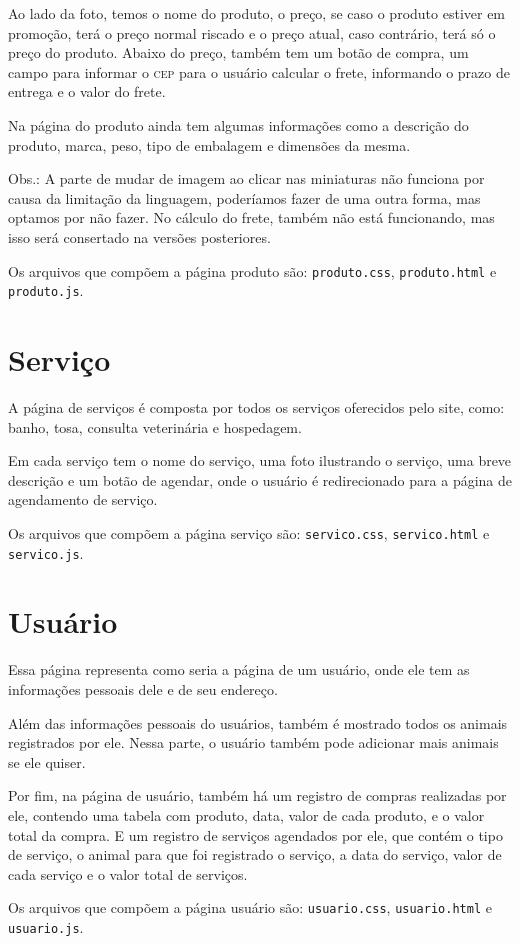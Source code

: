 Ao lado da foto, temos o nome do produto, o preço, se caso o produto estiver em promoção, terá
o preço normal riscado e o preço atual, caso contrário, terá só o preço do produto. Abaixo do
preço, também tem um botão de compra, um campo para informar o \textsc{cep} para o usuário
calcular o frete, informando o prazo de entrega e o valor do frete.

Na página do produto ainda tem algumas informações como a descrição do produto, marca, peso,
tipo de embalagem e dimensões da mesma.

Obs.: A parte de mudar de imagem ao clicar nas miniaturas não funciona por causa da limitação da
linguagem, poderíamos fazer de uma outra forma, mas optamos por não fazer. No cálculo do frete,
também não está funcionando, mas isso será consertado na versões posteriores.

Os arquivos que compõem a página produto são: \texttt{produto.css}, \texttt{produto.html} e
\texttt{produto.js}.

\section{Serviço}
A página de serviços é composta por todos os serviços oferecidos pelo site, como: banho, tosa,
consulta veterinária e hospedagem.

Em cada serviço tem o nome do serviço, uma foto ilustrando o serviço, uma breve descrição e um
botão de agendar, onde o usuário é redirecionado para a página de agendamento de serviço.

Os arquivos que compõem a página serviço são: \texttt{servico.css}, \texttt{servico.html} e
\texttt{servico.js}.

\section{Usuário}
Essa página representa como seria a página de um usuário, onde ele tem as informações pessoais
dele e de seu endereço.

Além das informações pessoais do usuários, também é mostrado todos os animais registrados por
ele. Nessa parte, o usuário também pode adicionar mais animais se ele quiser.

Por fim, na página de usuário, também há um registro de compras realizadas por ele, contendo
uma tabela com produto, data, valor de cada produto, e o valor total da compra. E um registro
de serviços agendados por ele, que contém o tipo de serviço, o animal para que foi registrado
o serviço, a data do serviço, valor de cada serviço e o valor total de serviços.

Os arquivos que compõem a página usuário são: \texttt{usuario.css}, \texttt{usuario.html} e
\texttt{usuario.js}.
